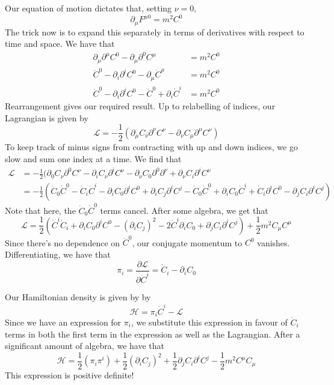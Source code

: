 Our equation of motion dictates that, setting $\nu = 0$, 
\[ 
\partial_\mu F^{ \mu 0 } = m^2 C^0 
\] 
The trick now is to expand this separately in terms of derivatives with respect to time and space. We have that 
\begin{align*} 
\partial_\mu \partial^\mu C^0  - \partial_\mu \partial^0 C^\mu  &= m^2 C^0 \\
\ddot{C}^0  - \partial_i \partial^i C^0  - \partial_\mu \dot{C}^\mu &= m^2 C^0 \\
\ddot{C}^0 - \partial_i \partial^i C^0  - \ddot{C}^0 + \partial_i\dot{C}^i &= m^2 C^0
\end{align*} 
Rearrangement gives our required result. 
Up to relabelling of indices, our Lagrangian is given by 
\[ 
\mathcal{L }  = - \frac{ 1}{ 2} ( \partial_\mu C_\nu \partial^\nu C^\nu  - \partial_\nu C_\mu \partial^\mu C^\nu ) 
\] 
To keep track of minus signs from contracting with up and down indices, we go slow and sum one index at a time. We find that 
\begin{align*} 
\mathcal{L} & = - \frac{1}{ 2}( \partial_0 C_\nu \partial^0 C^\nu  - \partial_i C_\nu \partial^i C^\nu  - \partial_\nu C_0 \partial^0 \partial^\nu +  \partial_\nu C_i \partial^i C^\nu \\
&=  - \frac{1}{2}(\dot{C}_0 \dot{C}^0 - \dot{C}_i \dot{C}^i  - \partial_i C_0 \partial^i C^0 + \partial_i C_j \partial^i C^j - \dot{C}_0 \dot{C}^0 + \partial_i C_0 \dot{C}^ i + \dot{C}_i \partial^i C^0  - \partial_j C_i \partial^i C^j )  
\end{align*} 
Note that here, the $\dot{C}_0\dot{C}^0$ terms cancel. After some algebra, we get that 
\[ 
\mathcal{ L } = \frac{1}{ 2}( \dot{ C}^i \dot{C}_i + \partial_i C_0 \partial^i C^0  - (\partial_i C_j)^2 - 2\dot{C}^i \partial_i C_0 + \partial_j C_i \partial^i C^j ) + \frac{1}{ 2} m^2 C_\mu C^\mu  
\] 
Since there's no dependence on $\dot{C}^0 $, our conjugate momentum to $C^0$ vanishes. Differentiating, we have that 
\[ 
\pi_i  = \frac{\partial \mathcal{L}}{ \partial \dot{C}^i }  = \dot{C}_i - \partial_i C_0
\] 

Our Hamiltonian density is given by by 
\[ 
\mathcal{H}  = \pi_i \dot{C}^i - \mathcal{L} 
\] 
Since we have an expression for $\pi_i$, we substitute this expression in favour of $\dot{ C}_i$ terms in both the first term in the expression as well as the Lagrangian. After a significant amount of algebra, we have that\[ 
\mathcal{H} = \frac{1}{2} (\pi_i \pi^i ) + \frac{1}{2} (\partial_i C_j)^2 + \frac{1}{2} \partial_j C_i \partial^i C^j - \frac{ 1}{ 2} m^2 C^\mu C_\mu 
\] 
This expression is positive definite!  
\pagebreak 

